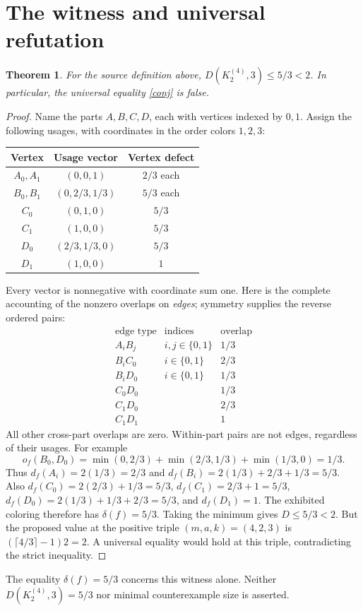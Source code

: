 \documentclass[11pt]{article}
\newtheorem{theorem}{Theorem}
\begin{document}
\newpage
\section{The witness and universal refutation}
\begin{theorem}\label{main}
For the source definition above, $D(K_2^{(4)},3)\leq5/3<2$.
In particular, the universal equality \eqref{conj} is false.
\end{theorem}
\begin{proof}
Name the parts $A,B,C,D$, each with vertices indexed by $0,1$. Assign the
following usages, with coordinates in the order colors $1,2,3$:
\begin{center}
\begin{tabular}{c c c}
\toprule Vertex & Usage vector & Vertex defect \\ \midrule
$A_0,A_1$ & $(0,0,1)$ & $2/3$ each\\
$B_0,B_1$ & $(0,2/3,1/3)$ & $5/3$ each\\
$C_0$ & $(0,1,0)$ & $5/3$\\
$C_1$ & $(1,0,0)$ & $5/3$\\
$D_0$ & $(2/3,1/3,0)$ & $5/3$\\
$D_1$ & $(1,0,0)$ & $1$\\ \bottomrule
\end{tabular}
\end{center}
Every vector is nonnegative with coordinate sum one. Here is the complete
accounting of the nonzero overlaps on \emph{edges}; symmetry supplies the
reverse ordered pairs:
\[
\begin{array}{c|c|c}
\text{edge type}&\text{indices}&\text{overlap}\\ \hline
A_iB_j&i,j\in\{0,1\}&1/3\\
B_iC_0&i\in\{0,1\}&2/3\\
B_iD_0&i\in\{0,1\}&1/3\\
C_0D_0&&1/3\\
C_1D_0&&2/3\\
C_1D_1&&1
\end{array}
\]
All other cross-part overlaps are zero. Within-part pairs are not edges,
regardless of their usages. For example
\[
 o_f(B_0,D_0)=\min(0,2/3)+\min(2/3,1/3)+\min(1/3,0)=1/3.
\]
Thus $d_f(A_i)=2(1/3)=2/3$ and
$d_f(B_i)=2(1/3)+2/3+1/3=5/3$.
Also $d_f(C_0)=2(2/3)+1/3=5/3$,
$d_f(C_1)=2/3+1=5/3$,
$d_f(D_0)=2(1/3)+1/3+2/3=5/3$, and $d_f(D_1)=1$.
The exhibited coloring therefore has $\delta(f)=5/3$.
Taking the minimum gives $D\leq5/3<2$.
But the proposed value at the positive triple $(m,a,k)=(4,2,3)$ is
$(\lceil4/3\rceil-1)2=2$. A universal equality would hold at this triple,
contradicting the strict inequality.
\end{proof}
The equality $\delta(f)=5/3$ concerns this witness alone. Neither
$D(K_2^{(4)},3)=5/3$ nor minimal counterexample size is asserted.
\end{document}
